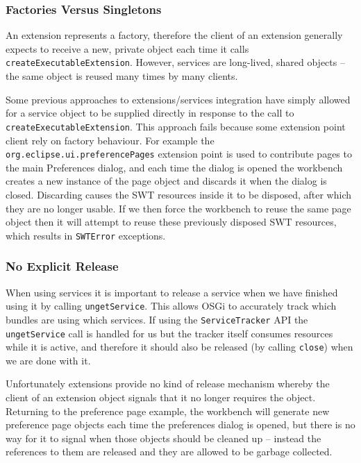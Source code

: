 \documentclass[12pt]{article}
\begin{document}
\subsubsection{Factories Versus Singletons}

An extension represents a factory, therefore the client of an extension generally expects to receive a new, private object each time it calls \texttt{create\-Exec\-utable\-Ext\-en\-sion}. However, services are long-lived, shared objects -- the same object is reused many times by many clients.

Some previous approaches to extensions/services integration have simply allowed for a service object to be supplied directly in response to the call to \texttt{create\-Exec\-utable\-Ext\-en\-sion}. This approach fails because some extension point client rely on factory behaviour. For example the \texttt{org.eclipse.ui.preferencePages} extension point is used to contribute pages to the main Preferences dialog, and each time the dialog is opened the workbench creates a new instance of the page object and discards it when the dialog is closed. Discarding causes the SWT resources inside it to be disposed, after which they are no longer usable. If we then force the workbench to reuse the same page object then it will attempt to reuse these previously disposed SWT resources, which results in \texttt{SWTError} exceptions. 

\subsubsection{No Explicit Release}

When using services it is important to release a service when we have finished using it by calling \texttt{ungetService}. This allows OSGi to accurately track which bundles are using which services. If using the \texttt{ServiceTracker} API the \texttt{ungetService} call is handled for us but the tracker itself consumes resources while it is active, and therefore it should also be released (by calling \texttt{close}) when we are done with it.

Unfortunately extensions provide no kind of release mechanism whereby the client of an extension object signals that it no longer requires the object. Returning to the preference page example, the workbench will generate new preference page objects each time the preferences dialog is opened, but there is no way for it to signal when those objects should be cleaned up -- instead the references to them are released and they are allowed to be garbage collected.
\end{document}
